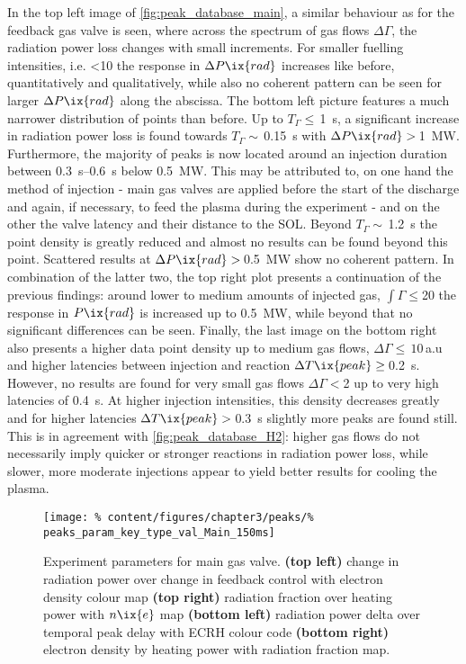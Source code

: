         In the top left image of \cref{fig:peak_database_main}, a similar behaviour as for the feedback gas valve is seen, where across the spectrum of gas flows $\Delta\Gamma$, the radiation power loss changes with small increments. For smaller fuelling intensities, i.e. <\SI{10}{\arbitraryunit} the response in $\Delta P\ix{rad}$ increases like before, quantitatively and qualitatively, while also no coherent pattern can be seen for larger $\Delta P\ix{rad}$ along the abscissa. The bottom left picture features a much narrower distribution of points than before. Up to $T_{\Gamma}\le\,$\SI{1}{\second}, a significant increase in radiation power loss is found towards $T_{\Gamma}\sim\,$\SI{0.15}{\second} with $\Delta P\ix{rad}>\,$\SI{1}{\mega\watt}. Furthermore, the majority of peaks is now located around an injection duration between \SIrange{0.3}{0.6}{\second} below \SI{0.5}{\mega\watt}. This may be attributed to, on one hand the method of injection - main gas valves are applied before the start of the discharge and again, if necessary, to feed the plasma during the experiment - and on the other the valve latency and their distance to the SOL. Beyond $T_{\Gamma}\sim\,$\SI{1.2}{\second} the point density is greatly reduced and almost no results can be found beyond this point. Scattered results at $\Delta P\ix{rad}>\,$\SI{0.5}{\mega\watt} show no coherent pattern. In combination of the latter two, the top right plot presents a continuation of the previous findings: around lower to medium amounts of injected gas, $\int\Gamma\le$\SI{20}{\arbitraryunit} the response in $P\ix{rad}$ is increased up to \SI{0.5}{\mega\watt}, while beyond that no significant differences can be seen. Finally, the last image on the bottom right also presents a higher data point density up to medium gas flows, $\Delta\Gamma\le\,10\,$a.u and higher latencies between injection and reaction $\Delta T\ix{peak}\ge\,$\SI{0.2}{\second}. However, no results are found for very small gas flows $\Delta\Gamma<$\SI{2}{\arbitraryunit} up to very high latencies of \SI{0.4}{\second}. At higher injection intensities, this density decreases greatly and for higher latencies $\Delta T\ix{peak}>\,$\SI{0.3}{\second} slightly more peaks are found still. This is in agreement with \cref{fig:peak_database_H2}: higher gas flows do not necessarily imply quicker or stronger reactions in radiation power loss, while slower, more moderate injections appear to yield better results for cooling the plasma.\\%
%
        \begin{figure}[t]%
            \centering%
            \texttt{[image: \%
                content/figures/chapter3/peaks/\%
                peaks\_param\_key\_type\_val\_Main\_150ms]}%
            \caption{Experiment parameters for main gas valve. \textbf{(top left)} change in radiation power over change in feedback control with electron density colour map \textbf{(top right)} radiation fraction over heating power with $n\ix{e}$ map \textbf{(bottom left)} radiation power delta over temporal peak delay with ECRH colour code \textbf{(bottom right)} electron density by heating power with radiation fraction map.}\label{fig:peak_parameters_Main}%
        \end{figure}%
